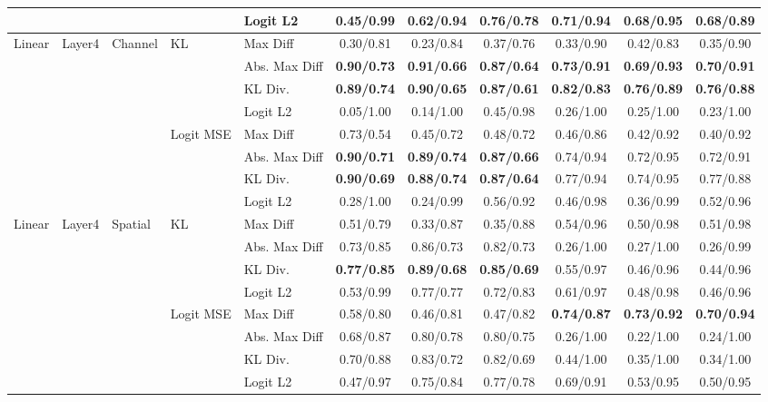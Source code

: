 \documentclass[border=2pt]{standalone}
\begin{document}
\begin{tabular}{lllllcccccc}
 &  &  &  & Logit L2 & 0.45/0.99 & 0.62/0.94 & 0.76/0.78 & 0.71/0.94 & 0.68/0.95 & 0.68/0.89 \\
\midrule
Linear & Layer4 & Channel & KL & Max Diff & 0.30/0.81 & 0.23/0.84 & 0.37/0.76 & 0.33/0.90 & 0.42/0.83 & 0.35/0.90 \\
 &  &  &  & Abs. Max Diff & \textbf{0.90/0.73} & \textbf{0.91/0.66} & \textbf{0.87/0.64} & \textbf{0.73/0.91} & \textbf{0.69/0.93} & \textbf{0.70/0.91} \\
 &  &  &  & KL Div. & \textbf{0.89/0.74} & \textbf{0.90/0.65} & \textbf{0.87/0.61} & \textbf{0.82/0.83} & \textbf{0.76/0.89} & \textbf{0.76/0.88} \\
 &  &  &  & Logit L2 & 0.05/1.00 & 0.14/1.00 & 0.45/0.98 & 0.26/1.00 & 0.25/1.00 & 0.23/1.00 \\
\addlinespace
 &  &  & Logit MSE & Max Diff & 0.73/0.54 & 0.45/0.72 & 0.48/0.72 & 0.46/0.86 & 0.42/0.92 & 0.40/0.92 \\
 &  &  &  & Abs. Max Diff &\textbf{0.90/0.71} & \textbf{0.89/0.74} & \textbf{0.87/0.66} & 0.74/0.94 & 0.72/0.95 & 0.72/0.91 \\
 &  &  &  & KL Div. & \textbf{0.90/0.69} & \textbf{0.88/0.74} & \textbf{0.87/0.64} & 0.77/0.94 & 0.74/0.95 & 0.77/0.88 \\
 &  &  &  & Logit L2 & 0.28/1.00 & 0.24/0.99 & 0.56/0.92 & 0.46/0.98 & 0.36/0.99 & 0.52/0.96 \\
\midrule
Linear & Layer4 & Spatial & KL & Max Diff & 0.51/0.79 & 0.33/0.87 & 0.35/0.88 & 0.54/0.96 & 0.50/0.98 & 0.51/0.98 \\
 &  &  &  & Abs. Max Diff & 0.73/0.85 & 0.86/0.73 & 0.82/0.73 & 0.26/1.00 & 0.27/1.00 & 0.26/0.99 \\
 &  &  &  & KL Div. & \textbf{0.77/0.85} & \textbf{0.89/0.68} & \textbf{0.85/0.69} & 0.55/0.97 & 0.46/0.96 & 0.44/0.96 \\
 &  &  &  & Logit L2 & 0.53/0.99 & 0.77/0.77 & 0.72/0.83 & 0.61/0.97 & 0.48/0.98 & 0.46/0.96 \\
\addlinespace
 &  &  & Logit MSE & Max Diff & 0.58/0.80 & 0.46/0.81 & 0.47/0.82 & \textbf{0.74/0.87} & \textbf{0.73/0.92} & \textbf{0.70/0.94} \\
 &  &  &  & Abs. Max Diff & 0.68/0.87 & 0.80/0.78 & 0.80/0.75 & 0.26/1.00 & 0.22/1.00 & 0.24/1.00 \\
 &  &  &  & KL Div. & 0.70/0.88 & 0.83/0.72 & 0.82/0.69 & 0.44/1.00 & 0.35/1.00 & 0.34/1.00 \\
 &  &  &  & Logit L2 & 0.47/0.97 & 0.75/0.84 & 0.77/0.78 & 0.69/0.91 & 0.53/0.95 & 0.50/0.95 \\
\bottomrule
\end{tabular}
\end{document}
